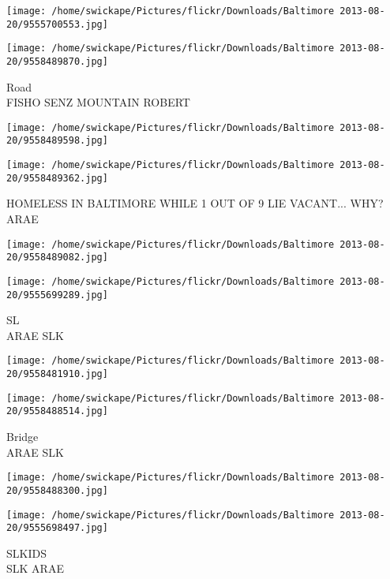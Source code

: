 \documentclass[10pt,letterpaper]{article}
\begin{document}
\texttt{[image: /home/swickape/Pictures/flickr/Downloads/Baltimore 2013-08-20/9555700553.jpg]}

\vspace{0.25in}
\texttt{[image: /home/swickape/Pictures/flickr/Downloads/Baltimore 2013-08-20/9558489870.jpg]}

Road\\
FISHO SENZ MOUNTAIN ROBERT\\
\pagebreak

\texttt{[image: /home/swickape/Pictures/flickr/Downloads/Baltimore 2013-08-20/9558489598.jpg]}

\vspace{0.25in}
\texttt{[image: /home/swickape/Pictures/flickr/Downloads/Baltimore 2013-08-20/9558489362.jpg]}

HOMELESS IN BALTIMORE WHILE 1 OUT OF 9 LIE VACANT... WHY?\\
ARAE\\
\pagebreak

\texttt{[image: /home/swickape/Pictures/flickr/Downloads/Baltimore 2013-08-20/9558489082.jpg]}

\vspace{0.25in}
\texttt{[image: /home/swickape/Pictures/flickr/Downloads/Baltimore 2013-08-20/9555699289.jpg]}

SL\\
ARAE SLK\\
\pagebreak

\texttt{[image: /home/swickape/Pictures/flickr/Downloads/Baltimore 2013-08-20/9558481910.jpg]}

\vspace{0.25in}
\texttt{[image: /home/swickape/Pictures/flickr/Downloads/Baltimore 2013-08-20/9558488514.jpg]}

Bridge\\
ARAE SLK\\
\pagebreak

\texttt{[image: /home/swickape/Pictures/flickr/Downloads/Baltimore 2013-08-20/9558488300.jpg]}

\vspace{0.25in}
\texttt{[image: /home/swickape/Pictures/flickr/Downloads/Baltimore 2013-08-20/9555698497.jpg]}

SLKIDS\\
SLK ARAE\\
\pagebreak
\end{document}
